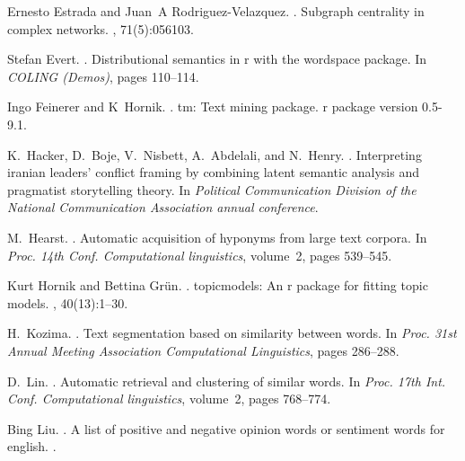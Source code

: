 \documentclass[11pt]{article}
\begin{document}
\begin{thebibliography}{}
Ernesto Estrada and Juan~A Rodriguez-Velazquez.
.
\newblock Subgraph centrality in complex networks.
, 71(5):056103.

Stefan Evert.
.
\newblock Distributional semantics in r with the wordspace package.
\newblock In {\em COLING (Demos)}, pages 110--114.

Ingo Feinerer and K~Hornik.
.
\newblock tm: Text mining package. r package version 0.5-9.1.

K.~Hacker, D.~Boje, V.~Nisbett, A.~Abdelali, and N.~Henry.
.
\newblock Interpreting iranian leaders' conflict framing by combining latent
  semantic analysis and pragmatist storytelling theory.
\newblock In {\em Political Communication Division of the National
  Communication Association annual conference}.

M.~Hearst.
.
\newblock Automatic acquisition of hyponyms from large text corpora.
\newblock In {\em Proc. 14th Conf. Computational linguistics}, volume~2, pages
  539--545.

Kurt Hornik and Bettina Gr{\"u}n.
.
\newblock topicmodels: An r package for fitting topic models.
, 40(13):1--30.

H.~Kozima.
.
\newblock Text segmentation based on similarity between words.
\newblock In {\em Proc. 31st Annual Meeting Association Computational
  Linguistics}, pages 286--288.

D.~Lin.
.
\newblock Automatic retrieval and clustering of similar words.
\newblock In {\em Proc. 17th Int. Conf. Computational linguistics}, volume~2,
  pages 768--774.

Bing Liu.
.
\newblock A list of positive and negative opinion words or sentiment words for
  english.
\newblock {\em l{\'\i}nea]. Disponible en: http://www. cs. uic. edu/\~{}
  liub/.[{\'U}ltimo acceso: Junio 2015]}.


\end{thebibliography}
\end{document}
